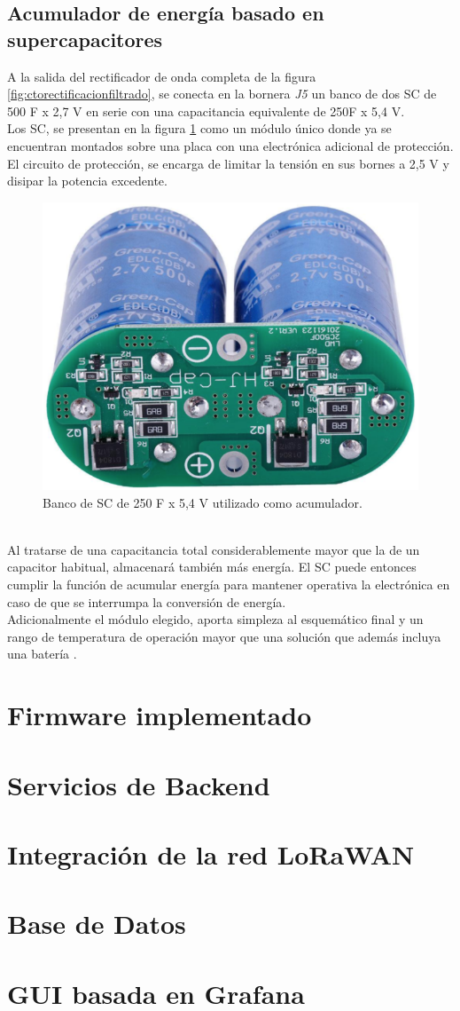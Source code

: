 \subsection{Acumulador de energía basado en supercapacitores}
A la salida del rectificador de onda completa de la figura \ref{fig:ctorectificacionfiltrado}, se conecta en la bornera \textit{J5} un banco de dos SC de 500 F x 2,7 V en serie con una capacitancia equivalente de 250F x 5,4 V.\\
Los SC, se presentan en la figura \ref{fig:imagensupercap} como un módulo único donde ya se encuentran montados sobre una placa con una electrónica adicional de protección. El circuito de protección, se encarga de limitar la tensión en sus bornes a 2,5 V y disipar la potencia excedente.\\
\begin{figure}[h]
	\centering
	\includegraphics[width=0.7\linewidth]{Figures/imagen_supercap}
	\caption{Banco de SC de 250 F x 5,4 V utilizado como acumulador.}
	\label{fig:imagensupercap}
\end{figure}\\
Al tratarse de una capacitancia total considerablemente mayor que la de un capacitor habitual, almacenará también más energía. El SC puede entonces cumplir la función de acumular energía para mantener operativa la electrónica en caso de que se interrumpa la conversión de energía.\\
Adicionalmente el módulo elegido, aporta simpleza al esquemático final y un rango de temperatura de operación mayor que una solución que además incluya una batería \citep{PORCARELLI20141671}.\\

 
\section{Firmware implementado}

\section{Servicios de Backend}

\section{Integraci\'{o}n de la red LoRaWAN}

\section{Base de Datos}

\section{GUI basada en Grafana}

